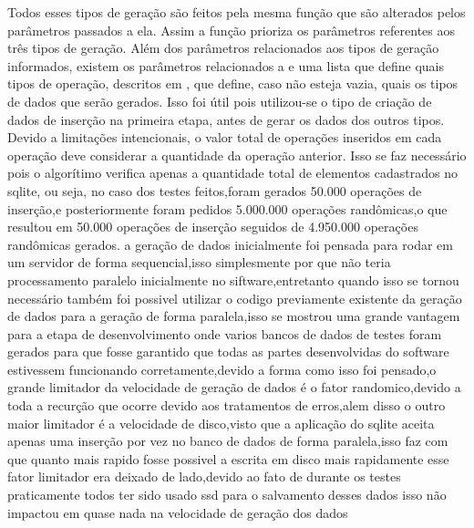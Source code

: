 \documentclass[
	12pt,				%
	openright,			%
	oneside,			%
	a4paper,			%
	english,			%
	french,				%
	spanish,			%
	brazil,				%
	]{abntex2}
\begin{document}
Todos esses tipos de geração são feitos pela mesma função que são alterados pelos parâmetros passados a ela. Assim a função prioriza os parâmetros referentes aos três tipos de geração.\newline
Além dos parâmetros relacionados aos tipos de geração informados, existem os parâmetros relacionados a  e uma lista que define quais tipos de operação, descritos em , que define, caso não esteja vazia, quais os tipos de dados que serão gerados. Isso foi útil pois utilizou-se o tipo de criação de dados de inserção na primeira etapa, antes de gerar os dados dos outros tipos.\newline
Devido a limitações intencionais, o valor total de operações inseridos em cada operação deve considerar a quantidade da operação anterior. Isso se faz necessário pois o algorítimo verifica apenas a quantidade total de elementos cadastrados no sqlite, ou seja, no caso dos testes feitos,foram gerados 50.000 operações de inserção,e posteriormente foram pedidos 5.000.000 operações randômicas,o que resultou em 50.000 operações de inserção seguidos de 4.950.000 operações randômicas gerados.
a geração de dados inicialmente foi pensada para rodar em um servidor de forma sequencial,isso simplesmente por que não teria processamento paralelo inicialmente no siftware,entretanto quando isso se tornou necessário também foi possivel utilizar o codigo previamente existente da geração de dados para a geração de forma paralela,isso se mostrou uma grande vantagem para a etapa de desenvolvimento onde varios bancos de dados de testes foram gerados para que fosse garantido que todas as partes desenvolvidas do software estivessem funcionando corretamente,devido a forma como isso foi pensado,o grande limitador da velocidade de geração de dados é o fator randomico,devido a toda a recurção que ocorre devido aos tratamentos de erros,alem disso o outro maior limitador é a velocidade de disco,visto que a aplicação do sqlite aceita apenas uma inserção por vez no banco de dados de forma paralela,isso faz com que quanto mais rapido fosse possivel a escrita em disco mais rapidamente esse fator limitador era deixado de lado,devido ao fato de durante os testes praticamente todos ter sido usado ssd para o salvamento desses dados isso não impactou em quase nada na velocidade de geração dos dados
\end{document}
